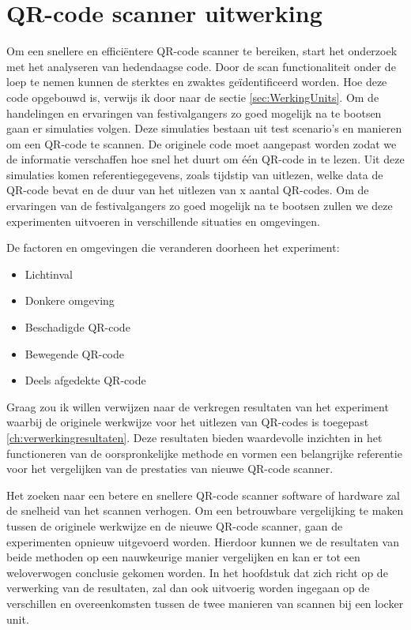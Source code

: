 \section{QR-code scanner uitwerking}%
\label{sec:scannerUitwerking}

Om een snellere en efficiëntere QR-code scanner te bereiken, start het onderzoek met het analyseren van hedendaagse code. Door de scan functionaliteit onder de loep te nemen kunnen de sterktes en zwaktes geïdentificeerd worden. Hoe deze code opgebouwd is, verwijs ik door naar de sectie \ref{sec:WerkingUnits}.
Om de handelingen en ervaringen van festivalgangers zo goed mogelijk na te bootsen gaan er simulaties volgen. Deze simulaties bestaan uit test scenario’s en manieren om een QR-code te scannen. De originele code moet aangepast worden zodat we de informatie verschaffen hoe snel het duurt om één QR-code in te lezen. Uit deze simulaties komen referentiegegevens, zoals tijdstip van uitlezen, welke data de QR-code bevat en de duur van het uitlezen van x aantal QR-codes. Om de ervaringen van de festivalgangers zo goed mogelijk na te bootsen zullen we deze experimenten uitvoeren in verschillende situaties en omgevingen.

De factoren en omgevingen die veranderen doorheen het experiment:

\begin{itemize}
    \item Lichtinval
    \item Donkere omgeving
    \item Beschadigde QR-code
    \item Bewegende QR-code
    \item Deels afgedekte QR-code
\end{itemize}


Graag zou ik willen verwijzen naar de verkregen resultaten van het experiment waarbij de originele werkwijze voor het uitlezen van QR-codes is toegepast \ref{ch:verwerkingresultaten}. Deze resultaten bieden waardevolle inzichten in het functioneren van de oorspronkelijke methode en vormen een belangrijke referentie voor het vergelijken van de prestaties van nieuwe QR-code scanner.

Het zoeken naar een betere en snellere QR-code scanner software of hardware zal de snelheid van het scannen verhogen. Om een betrouwbare vergelijking te maken tussen de originele werkwijze en de nieuwe QR-code scanner, gaan de experimenten opnieuw uitgevoerd worden. Hierdoor kunnen we de resultaten van beide methoden op een nauwkeurige manier vergelijken en kan er tot een weloverwogen conclusie gekomen worden. In het hoofdstuk dat zich richt op de verwerking van de resultaten, zal dan ook uitvoerig worden ingegaan op de verschillen en overeenkomsten tussen de twee manieren van scannen bij een locker unit.


